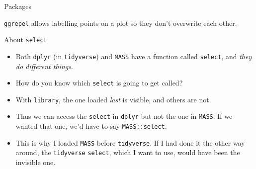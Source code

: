 \documentclass[unknownkeysallowed]{beamer}\usepackage[]{graphicx}\usepackage[]{color}
\makeatletter
\newenvironment{kframe}{%
 \def\at@end@of@kframe{}%
 \ifinner\ifhmode%
  \def\at@end@of@kframe{\end{minipage}}%
  \begin{minipage}{\columnwidth}%
 \fi\fi%
 \def\FrameCommand##1{\hskip\@totalleftmargin \hskip-\fboxsep
 \colorbox{shadecolor}{##1}\hskip-\fboxsep
     \hskip-\linewidth \hskip-\@totalleftmargin \hskip\columnwidth}%
 \MakeFramed {\advance\hsize-\width
   \@totalleftmargin\z@ \linewidth\hsize
   \@setminipage}}%
 {\par\unskip\endMakeFramed%
 \at@end@of@kframe}
\newenvironment{knitrout}{}{} %
\makeatother
\begin{document}
\begin{frame}[fragile]{Packages}
\begin{knitrout}
\begin{kframe}
{\ttfamily\noindent\itshape\color{messagecolor}{\#\# The following objects are masked from 'package:dplyr':\\\#\# \\\#\#\ \ \ \  arrange, count, desc, failwith, id, mutate, rename, summarise, summarize}}

{\ttfamily\noindent\itshape\color{messagecolor}{\#\# The following object is masked from 'package:purrr':\\\#\# \\\#\#\ \ \ \  compact}}

{\ttfamily\noindent\itshape\color{messagecolor}{\#\# Loading required package: scales}}

{\ttfamily\noindent\itshape\color{messagecolor}{\#\# \\\#\# Attaching package: 'scales'}}

{\ttfamily\noindent\itshape\color{messagecolor}{\#\# The following object is masked from 'package:purrr':\\\#\# \\\#\#\ \ \ \  discard}}

{\ttfamily\noindent\itshape\color{messagecolor}{\#\# The following object is masked from 'package:readr':\\\#\# \\\#\#\ \ \ \  col\_factor}}

{\ttfamily\noindent\itshape\color{messagecolor}{\#\# Loading required package: grid}}\end{kframe}
\end{knitrout}

\texttt{ggrepel} allows labelling points on a plot so they don't
overwrite each other.
\end{frame}

\begin{frame}[fragile]{About \texttt{select}}
  
  \begin{itemize}
  \item Both \texttt{dplyr} (in \texttt{tidyverse}) and \texttt{MASS}
    have a function called \texttt{select}, and \emph{they do
      different things}.
  \item How do you know which \texttt{select} is going to get called? 
  \item With \texttt{library}, the one loaded \emph{last} is visible,
    and others are not.
  \item Thus we can access the \texttt{select} in \texttt{dplyr} but
    not the one in \texttt{MASS}. If we wanted that one, we'd have to
    say \texttt{MASS::select}.
  \item This is why I loaded \texttt{MASS} before
    \texttt{tidyverse}. If I had done it the other way around, the
    \texttt{tidyverse} \texttt{select}, which I want to use, would have
    been the invisible one.  
  \end{itemize}
\end{frame}
\end{document}
